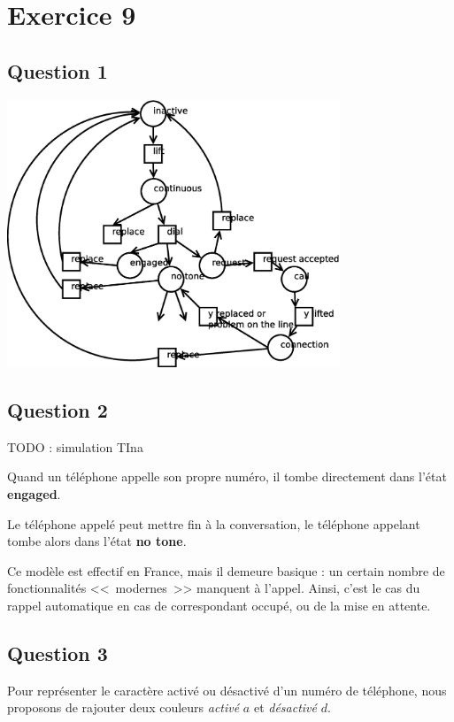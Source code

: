 \section{Exercice 9}
\subsection{Question 1}

\begin{center}
\includegraphics[height = 8cm]{exo9_1.eps}
\end{center}

\subsection{Question 2}

TODO : simulation TIna

Quand un téléphone appelle son propre numéro, il tombe directement dans l'état \textbf{engaged}.

Le téléphone appelé peut mettre fin à la conversation, le téléphone
appelant tombe alors dans l'état \textbf{no tone}.

Ce modèle est effectif en France, mais il demeure basique : un certain
nombre de fonctionnalités <<~modernes~>> manquent à l'appel. Ainsi,
c'est le cas du rappel automatique en cas de correspondant occupé, ou
de la mise en attente.

\subsection{Question 3}

Pour représenter le caractère activé ou désactivé d'un numéro de
téléphone, nous proposons de rajouter deux couleurs \textit{activé}
$a$ et \textit{désactivé} $d$.

